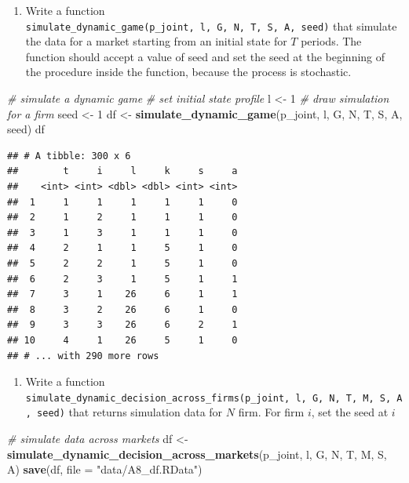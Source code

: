 \documentclass[]{book}
\newenvironment{Shaded}{\begin{snugshade}}{\end{snugshade}}
\newcommand{\KeywordTok}[1]{\textcolor[rgb]{0.13,0.29,0.53}{\textbf{#1}}}
\newcommand{\DataTypeTok}[1]{\textcolor[rgb]{0.13,0.29,0.53}{#1}}
\newcommand{\DecValTok}[1]{\textcolor[rgb]{0.00,0.00,0.81}{#1}}
\newcommand{\StringTok}[1]{\textcolor[rgb]{0.31,0.60,0.02}{#1}}
\newcommand{\CommentTok}[1]{\textcolor[rgb]{0.56,0.35,0.01}{\textit{#1}}}
\newcommand{\NormalTok}[1]{#1}
\providecommand{\tightlist}{%
  \setlength{\itemsep}{0pt}\setlength{\parskip}{0pt}}
\begin{document}
\begin{enumerate}
\def\labelenumi{\arabic{enumi}.}
\setcounter{enumi}{11}
\tightlist
\item
  Write a function
  \texttt{simulate\_dynamic\_game(p\_joint,\ l,\ G,\ N,\ T,\ S,\ A,\ seed)}
  that simulate the data for a market starting from an initial state for
  \(T\) periods. The function should accept a value of seed and set the
  seed at the beginning of the procedure inside the function, because
  the process is stochastic.
\end{enumerate}

\begin{Shaded}
\begin{Highlighting}[]
\CommentTok{# simulate a dynamic game}
\CommentTok{# set initial state profile}
\NormalTok{l <-}\StringTok{ }\DecValTok{1}
\CommentTok{# draw simulation for a firm}
\NormalTok{seed <-}\StringTok{ }\DecValTok{1}
\NormalTok{df <-}\StringTok{ }\KeywordTok{simulate_dynamic_game}\NormalTok{(p_joint, l, G, N, T, S, A, seed)}
\NormalTok{df}
\end{Highlighting}
\end{Shaded}

\begin{verbatim}
## # A tibble: 300 x 6
##        t     i     l     k     s     a
##    <int> <int> <dbl> <dbl> <int> <int>
##  1     1     1     1     1     1     0
##  2     1     2     1     1     1     0
##  3     1     3     1     1     1     0
##  4     2     1     1     5     1     0
##  5     2     2     1     5     1     0
##  6     2     3     1     5     1     1
##  7     3     1    26     6     1     1
##  8     3     2    26     6     1     0
##  9     3     3    26     6     2     1
## 10     4     1    26     5     1     0
## # ... with 290 more rows
\end{verbatim}

\begin{enumerate}
\def\labelenumi{\arabic{enumi}.}
\setcounter{enumi}{12}
\tightlist
\item
  Write a function
  \texttt{simulate\_dynamic\_decision\_across\_firms(p\_joint,\ l,\ G,\ N,\ T,\ M,\ S,\ A,\ seed)}
  that returns simulation data for \(N\) firm. For firm \(i\), set the
  seed at \(i\)
\end{enumerate}

\begin{Shaded}
\begin{Highlighting}[]
\CommentTok{# simulate data across markets}
\NormalTok{df <-}\StringTok{ }\KeywordTok{simulate_dynamic_decision_across_markets}\NormalTok{(p_joint, l, G, N, T, M, S, A)}
\KeywordTok{save}\NormalTok{(df, }\DataTypeTok{file =} \StringTok{"data/A8_df.RData"}\NormalTok{)}
\end{Highlighting}
\end{Shaded}
\end{document}
